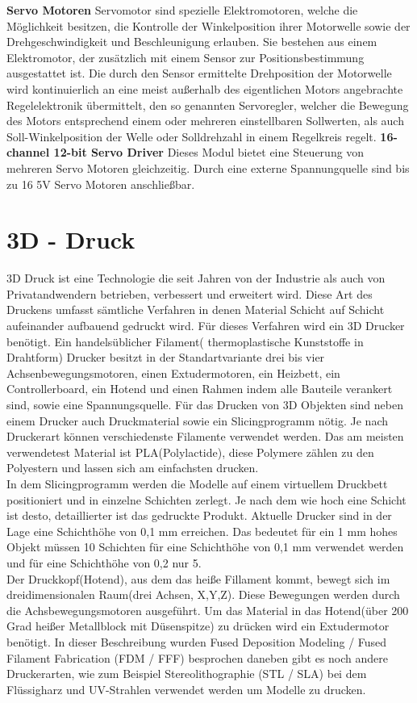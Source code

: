 \documentclass[12pt,					%
							 oneside,			%
							 a4paper,			%
							 halfparskip,		%
							 liststotoc,			%
							 bibtotoc,			%
							 fleqn,				%
							 pointlessnumbers]	%
							 {scrreprt}
\begin{document}
\textbf{Servo Motoren}\newline
	Servomotor sind spezielle Elektromotoren, welche die Möglichkeit besitzen, die Kontrolle der Winkelposition ihrer Motorwelle sowie der Drehgeschwindigkeit und Beschleunigung erlauben. Sie bestehen aus einem Elektromotor, der zusätzlich mit einem Sensor zur Positionsbestimmung ausgestattet ist.  Die durch den Sensor ermittelte Drehposition der Motorwelle wird kontinuierlich an eine meist außerhalb des eigentlichen Motors angebrachte Regelelektronik übermittelt, den so genannten Servoregler, welcher die Bewegung des Motors entsprechend einem oder mehreren einstellbaren Sollwerten, als auch Soll-Winkelposition der Welle oder Solldrehzahl in einem Regelkreis regelt.	
	\newline\newline	
\textbf{16-channel 12-bit Servo Driver}\newline
	Dieses Modul bietet eine Steuerung von mehreren Servo Motoren gleichzeitig. Durch eine externe Spannungquelle sind bis zu 16 5V Servo Motoren anschließbar.

\section{3D - Druck}
3D Druck ist eine Technologie die seit Jahren von der Industrie als auch von Privatandwendern betrieben, verbessert und erweitert wird. Diese Art des Druckens umfasst sämtliche Verfahren in denen Material Schicht auf Schicht aufeinander aufbauend gedruckt wird.
Für dieses Verfahren wird ein 3D Drucker benötigt. Ein handelsüblicher Filament( thermoplastische Kunststoffe in Drahtform) Drucker besitzt in der Standartvariante drei bis vier Achsenbewegungsmotoren, einen Extudermotoren, ein Heizbett, ein Controllerboard, ein Hotend und einen Rahmen indem alle Bauteile verankert sind, sowie eine Spannungsquelle.
Für das Drucken von 3D Objekten sind neben einem Drucker auch Druckmaterial sowie ein Slicingprogramm nötig. Je nach Druckerart können verschiedenste Filamente verwendet werden. Das am meisten verwendetest Material ist PLA(Polylactide), diese Polymere zählen zu den Polyestern und lassen sich am einfachsten drucken. \\
In dem Slicingprogramm werden die Modelle auf einem virtuellem Druckbett positioniert und in einzelne Schichten zerlegt. Je nach dem wie hoch eine Schicht ist desto, detaillierter ist das gedruckte Produkt. Aktuelle Drucker sind in der Lage eine Schichthöhe von 0,1 mm erreichen. Das bedeutet für ein 1 mm hohes Objekt müssen 10 Schichten für eine Schichthöhe von 0,1 mm verwendet werden und für eine Schichthöhe von 0,2 nur 5. \\
Der Druckkopf(Hotend), aus dem das heiße Fillament kommt, bewegt sich im dreidimensionalen Raum(drei Achsen, X,Y,Z). Diese Bewegungen werden durch die Achsbewegungsmotoren ausgeführt. Um das Material in das Hotend(über 200 Grad heißer Metallblock mit Düsenspitze) zu drücken wird ein Extudermotor benötigt.
In dieser Beschreibung wurden Fused Deposition Modeling / Fused Filament Fabrication (FDM / FFF) besprochen daneben gibt es noch andere Druckerarten, wie zum Beispiel Stereolithographie (STL / SLA) bei dem Flüssigharz und UV-Strahlen verwendet werden um Modelle zu drucken.
\end{document}

